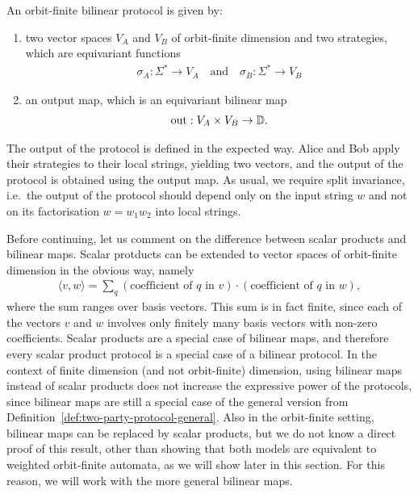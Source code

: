 \begin{definition}
    \label{def:orbit-finite-scalar-product-protocol}
    An orbit-finite bilinear protocol is given by:
    \begin{enumerate}
        \item two vector spaces $V_A$ and $V_B$ of orbit-finite dimension  and two strategies, which are  equivariant functions
        \begin{align*}
        \sigma_A : \Sigma^* \to V_A 
        \quad \text{and} \quad
        \sigma_B : \Sigma^* \to V_B
        \end{align*}
        \item an output map, which is an equivariant bilinear map 
        \begin{align*}
        \text{out} : V_A \times V_B \to \mathbb D.
        \end{align*}
    \end{enumerate}
\end{definition}
The output of the protocol is defined in the expected way. Alice and Bob apply their strategies to their local strings, yielding two vectors, and the output of the protocol is obtained using the output map. As usual, we require split invariance, i.e.~the output of the protocol should depend only on the input string $w$ and not on its factorisation $w = w_1 w_2$ into local strings. 

Before continuing, let us comment on the difference between scalar products and bilinear maps. Scalar protducts can be extended to vector spaces of orbit-finite dimension in the obvious way, namely
\begin{align*}
\langle v, w \rangle = \sum_{q} (\text{coefficient of $q$ in $v$}) \cdot ( \text{coefficient of $q$ in $w$}),
\end{align*}
where the sum ranges over basis vectors. This sum is in fact finite, since each of the vectors $v$ and $w$ involves only finitely many basis vectors with non-zero coefficients.
Scalar products are a special case of bilinear maps, and therefore every scalar product protocol is a special case of a bilinear protocol. In the context of finite dimension (and not orbit-finite) dimension, using bilinear maps instead of scalar products does not increase the expressive power of the protocols, since bilinear maps are still a special case of the general version from Definition~\ref{def:two-party-protocol-general}. Also in the orbit-finite setting, bilinear maps can be replaced by scalar products, but we do not know a direct proof of this result, other than showing that both models are equivalent to weighted orbit-finite automata, as we will show later in this section. For this reason, we will work with the more general bilinear maps. 

